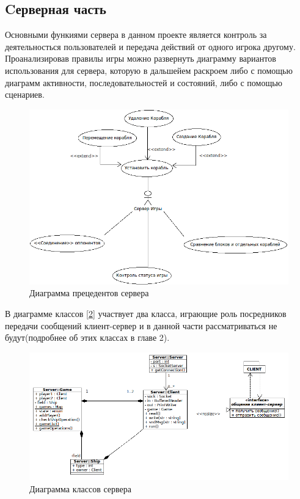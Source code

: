 ﻿\subsection{Cерверная часть}

Основными функиями сервера в данном проекте является контроль за деятельносться пользователей и передача действий от одного игрока другому. Проанализировав правилы игры можно развернуть диаграмму вариантов использования для сервера, которую в дальшейем раскроем либо с помощью диаграмм активности, последовательностей и состояний, либо с помощью сценариев.
  
\begin{figure}[htp]
\centering
\includegraphics[width=15cm]{images/useserver.png}
\caption{Диаграмма прецедентов сервера}
\label{fig14}
\end{figure}

В диаграмме классов [\ref{fig15}] участвует два класса, играющие роль посредников передачи сообщений клиент-сервер и в данной части рассматриваться не будут(подробнее об этих классах в главе 2). 

\begin{figure}[htp]
\centering
\includegraphics[width=18cm]{images/class_server.png}
\caption{Диаграмма классов сервера}
\label{fig15}
\end{figure}

